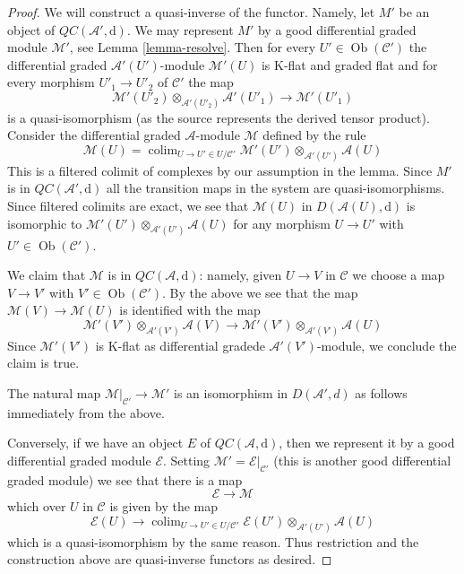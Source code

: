 \documentclass[10pt,a4paper]{amsart}
\theoremstyle{plain}
\theoremstyle{definition}
\theoremstyle{remark}
\numberwithin{equation}{subsection}
\def\colim{\mathop{\mathrm{colim}}\nolimits}
\def\Ob{\mathop{\mathrm{Ob}}\nolimits}
\begin{document}
\begin{proof}
We will construct a quasi-inverse of the functor. Namely,
let $M'$ be an object of $\mathit{QC}(\mathcal{A}', \text{d})$.
We may represent $M'$ by a good differential graded module $\mathcal{M}'$,
see Lemma \ref{lemma-resolve}. Then for every $U' \in \Ob(\mathcal{C}')$
the differential graded $\mathcal{A}'(U')$-module $\mathcal{M}'(U)$
is K-flat and graded flat and for every morphism $U'_1 \to U'_2$ of
$\mathcal{C}'$ the map
$$
\mathcal{M}'(U'_2) \otimes_{\mathcal{A}'(U'_2)} \mathcal{A}'(U'_1)
\longrightarrow
\mathcal{M}'(U'_1)
$$
is a quasi-isomorphism (as the source represents the derived tensor product).
Consider the differential graded
$\mathcal{A}$-module $\mathcal{M}$ defined by the rule
$$
\mathcal{M}(U) =
\colim_{U \to U' \in U/\mathcal{C}'}
\mathcal{M}'(U') \otimes_{\mathcal{A}'(U')} \mathcal{A}(U)
$$
This is a filtered colimit of complexes by our assumption in the lemma.
Since $M'$ is in $\mathit{QC}(\mathcal{A}', \text{d})$ all the
transition maps in the system are quasi-isomorphisms. Since filtered
colimits are exact, we see that
$\mathcal{M}(U)$ in $D(\mathcal{A}(U), \text{d})$
is isomorphic to $\mathcal{M}'(U') \otimes_{\mathcal{A}'(U')} \mathcal{A}(U)$
for any morphism $U \to U'$ with $U' \in \Ob(\mathcal{C}')$.

\medskip\noindent
We claim that $\mathcal{M}$ is in
$\mathit{QC}(\mathcal{A}, \text{d})$: namely, given $U \to V$ in
$\mathcal{C}$ we choose a map $V \to V'$ with $V' \in \Ob(\mathcal{C}')$.
By the above we see that the map $\mathcal{M}(V) \to \mathcal{M}(U)$
is identified with the map
$$
\mathcal{M}'(V') \otimes_{\mathcal{A}'(V')} \mathcal{A}(V)
\longrightarrow
\mathcal{M}'(V') \otimes_{\mathcal{A}'(V')} \mathcal{A}(U)
$$
Since $\mathcal{M'}(V')$ is K-flat as
differential gradede $\mathcal{A}'(V')$-module, we conclude
the claim is true.

\medskip\noindent
The natural map $\mathcal{M}|_{\mathcal{C}'} \to \mathcal{M}'$ is an
isomorphism in $D(\mathcal{A}', d)$ as follows immediately from the above.

\medskip\noindent
Conversely, if we have an object $E$ of $\mathit{QC}(\mathcal{A}, \text{d})$,
then we represent it by a good differential graded module $\mathcal{E}$.
Setting $\mathcal{M}' = \mathcal{E}|_{\mathcal{C}'}$ (this is another good
differential graded module) we see that there is a map
$$
\mathcal{E} \to \mathcal{M}
$$
which over $U$ in $\mathcal{C}$ is given by the map
$$
\mathcal{E}(U)
\longrightarrow
\colim_{U \to U' \in U/\mathcal{C}'}
\mathcal{E}(U') \otimes_{\mathcal{A}'(U')} \mathcal{A}(U)
$$
which is a quasi-isomorphism by the same reason. Thus restriction and
the construction above are quasi-inverse functors as desired.
\end{proof}
\end{document}
